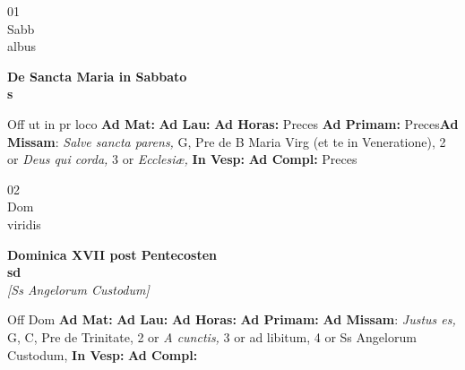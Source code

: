 \documentclass[10pt, openany]{book}
\begin{document}
        \begin{center}
            \begin{minipage}{3.5in}
                \vspace{2em}
                \begin{minipage}{0.5in}
                    {\Huge 01} \\
                    {\normalsize Sabb} \\
                    {\normalsize albus}
                \end{minipage}
                \begin{minipage}{3.0in}
                    \textbf{ \large De Sancta Maria in Sabbato \\
                    \textnormal{\normalsize s}} \\ 
                \end{minipage}
                \begin{justify}Off ut in pr loco
                    \textbf{Ad Mat: }
                    \textbf{Ad Lau: }
                    \textbf{Ad Horas: }Preces
                    \textbf{Ad Primam: }Preces\textbf{Ad Missam}: \textit{Salve sancta parens,} G, Pre de B Maria Virg (et te in Veneratione), 2 or \textit{Deus qui corda,} 3 or \textit{Ecclesiæ,}  
                    \textbf{In Vesp: }
                    \textbf{Ad Compl: }Preces
                \end{justify}
            \end{minipage}
        \end{center}
    
        \begin{center}
            \begin{minipage}{3.5in}
                \vspace{2em}
                \begin{minipage}{0.5in}
                    {\Huge 02} \\
                    {\normalsize Dom} \\
                    {\normalsize viridis}
                \end{minipage}
                \begin{minipage}{3.0in}
                    \textbf{ \large Dominica XVII post Pentecosten \\
                    \textnormal{\normalsize sd}} \\ \textit{[Ss Angelorum Custodum]} \\ 
                \end{minipage}
                \begin{justify}Off Dom
                    \textbf{Ad Mat: }
                    \textbf{Ad Lau: }
                    \textbf{Ad Horas: }
                    \textbf{Ad Primam: }\textbf{Ad Missam}: \textit{Justus es,} G, C, Pre de Trinitate, 2 or \textit{A cunctis,} 3 or ad libitum, 4 or Ss Angelorum Custodum,  
                    \textbf{In Vesp: }
                    \textbf{Ad Compl: }
                \end{justify}
            \end{minipage}
        \end{center}
    
\end{document}
